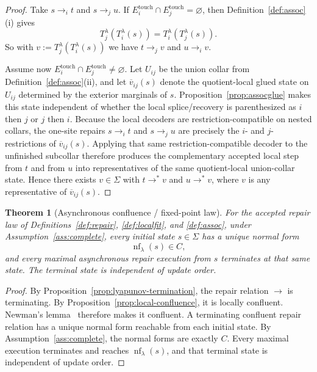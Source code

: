 \documentclass[11pt]{article}
\newtheorem{theorem}{Theorem}[section]
\theoremstyle{remark}
\theoremstyle{plain}
\begin{document}
\begin{proof}
Take \(s\to_i t\) and \(s\to_j u\).
If \(E_i^{\mathrm{touch}}\cap E_j^{\mathrm{touch}}=\varnothing\), then
Definition~\ref{def:assoc}(i) gives
\[
T_j^\lambda(T_i^\lambda(s))=T_i^\lambda(T_j^\lambda(s)).
\]
So with \(v:=T_j^\lambda(T_i^\lambda(s))\) we have \(t\to_j v\) and \(u\to_i v\).

Assume now \(E_i^{\mathrm{touch}}\cap E_j^{\mathrm{touch}}\neq\varnothing\). Let \(U_{ij}\) be the
union collar from Definition~\ref{def:assoc}(ii), and let \(\overline v_{ij}(s)\) denote the
quotient-local glued state on \(U_{ij}\) determined by the exterior marginals of \(s\).
Proposition~\ref{prop:assocglue} makes this state independent of whether the local
splice/recovery is parenthesized as \(i\) then \(j\) or \(j\) then \(i\). Because the local
decoders are restriction-compatible on nested collars, the one-site repairs \(s\to_i t\) and
\(s\to_j u\) are precisely the \(i\)- and \(j\)-restrictions of \(\overline v_{ij}(s)\).
Applying that same restriction-compatible decoder to the unfinished subcollar therefore produces
the complementary accepted local step from \(t\) and from \(u\) into representatives of the same
quotient-local union-collar state. Hence there exists \(v\in\Sigma\) with \(t\to^* v\) and
\(u\to^* v\), where \(v\) is any representative of \(\overline v_{ij}(s)\).
\end{proof}

\begin{theorem}[Asynchronous confluence / fixed-point law]\label{thm:confluence}
For the accepted repair law of Definitions~\ref{def:repair}, \ref{def:localfit}, and
\ref{def:assoc}, under Assumption~\ref{ass:complete}, every initial state $s\in\Sigma$ has a unique normal form
\[
\operatorname{nf}_\lambda(s)\in C,
\]
and every maximal asynchronous repair execution from $s$ terminates at that same state. The terminal state is independent of update order.
\end{theorem}

\begin{proof}
By Proposition~\ref{prop:lyapunov-termination}, the repair relation \(\to\) is terminating.
By Proposition~\ref{prop:local-confluence}, it is locally confluent. Newman's
lemma~\cite{newman42} therefore makes it confluent. A terminating confluent repair relation has a
unique normal form reachable from each initial state. By Assumption~\ref{ass:complete}, the
normal forms are exactly \(C\). Every maximal execution terminates and reaches
\(\operatorname{nf}_\lambda(s)\), and that terminal state is independent of update order.
\end{proof}
\end{document}
